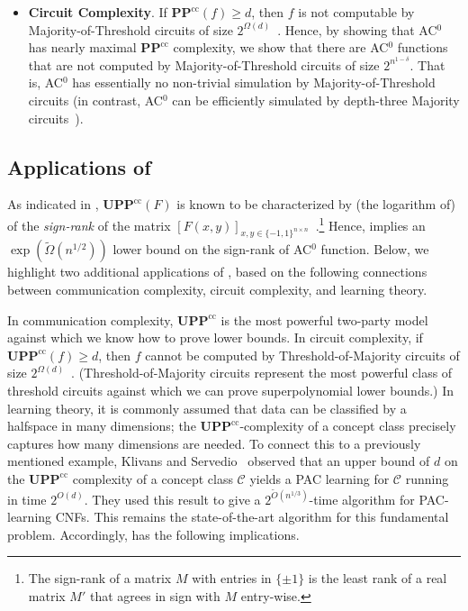 \documentclass{toc}
\newcommand{\bits}{\{-1,1\}}
\newcommand{\PPcc}{\mathbf{PP}^{\text{cc}}}
\newcommand{\UPP}{\mathbf{UPP}}
\newcommand{\UPPcc}{\mathbf{UPP}^{\text{cc}}}
\begin{document}
\begin{itemize}
	\vspace{-1mm}
	\item \textbf{Circuit Complexity}.  If $\PPcc(f)\geq d$, then $f$ is not computable by Majority-of-Threshold circuits of size $2^{\Omega(d)}$~\cite{nisan}.
	Hence, by showing that AC$^0$ has nearly maximal $\PPcc$ complexity, we show
	that there are AC$^0$ functions that are not computed by Majority-of-Threshold circuits of size $2^{n^{1-\delta}}$.
	That is, AC$^0$ has essentially no non-trivial simulation by Majority-of-Threshold circuits (in contrast,
AC$^0$ can be efficiently simulated by depth-three Majority circuits~\cite{allender}).
	
	
	
\end{itemize}


\subsection{Applications of } 

As indicated in , $\UPPcc(F)$ is known to be characterized by (the logarithm of)
of the \emph{sign-rank} of the matrix $[F(x, y)]_{x, y \in \bits^{n \times n}}$~\cite{paturisimon}.\footnote{The sign-rank of a matrix $M$
	with entries in $\{\pm1\}$
	is the least rank of a real matrix $M'$ that agrees in sign with $M$ entry-wise.}
Hence,   implies an $\exp(\tilde{\Omega}(n^{1/2}))$ lower bound on the sign-rank of AC$^0$ function.
Below, we highlight two additional applications of  , based on the following connections
between communication complexity, circuit complexity, and learning theory. 

In communication complexity, $\UPP^{\text{cc}}$ is the most powerful two-party model against which we know how to prove lower bounds. 
In circuit complexity, if $\UPP^{\text{cc}}(f) \geq d$, then $f$ cannot be computed
by Threshold-of-Majority circuits of size $2^{\Omega(d)}$~\cite{forstertm}. (Threshold-of-Majority circuits represent the most powerful class of threshold circuits against which we can
prove superpolynomial lower bounds.)
In learning theory, it is commonly assumed that data can be classified by a halfspace in many dimensions; the $\UPP^{\text{cc}}$-complexity of a concept class precisely captures how many dimensions are needed.
To connect this to a previously mentioned example, Klivans and Servedio~\cite{ksdnf} observed that an upper bound of $d$ on the $\UPPcc$
complexity of a concept class $\mathcal{C}$ yields a PAC learning for $\mathcal{C}$ running in time $2^{O(d)}$. They 
used this result to give a $2^{\tilde{O}(n^{1/3})}$-time algorithm for PAC-learning CNFs. This remains the state-of-the-art algorithm for this fundamental problem.
Accordingly,  has the following implications.
\end{document}
